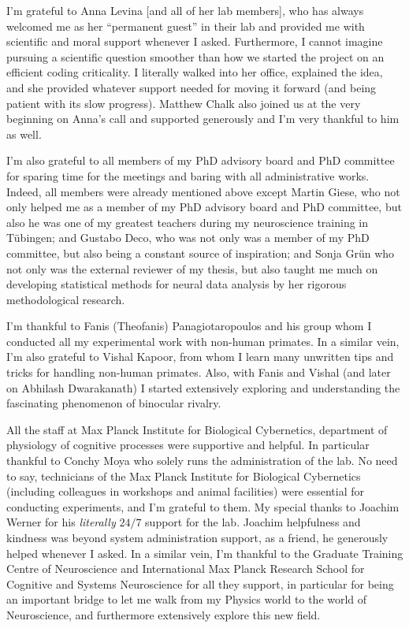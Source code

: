I'm grateful to Anna Levina [and all of her lab members], who has always welcomed me as her ``permanent guest'' in their lab and provided me with scientific and moral support whenever I asked.
Furthermore, I cannot imagine pursuing a scientific question smoother than how we started the project on an efficient coding criticality.
I literally walked into her office, explained the idea, and she provided whatever support needed for moving it forward (and being patient with its slow progress).
Matthew Chalk also joined us at the very beginning on Anna's call and supported generously and I'm very thankful to him as well.

I'm also grateful to all members of my PhD advisory board and PhD committee for sparing time for the meetings and baring with all  administrative works.
Indeed, all members were already mentioned above except Martin Giese,
who not only  helped me as a member of my PhD advisory board and PhD committee,
but also he was one of my greatest teachers during my neuroscience training in T\"ubingen;
and Gustabo Deco, who was not only was a member of my PhD committee, but also being  a constant source of inspiration;
and Sonja Gr\"un who not only was the external reviewer of my thesis, but also taught me much on developing statistical methods for neural data analysis by her rigorous methodological research.

I'm thankful
to Fanis (Theofanis) Panagiotaropoulos and his group whom I conducted all my experimental work with non-human primates.
In a similar vein, I'm also grateful to Vishal Kapoor, from whom I learn many unwritten tips and tricks for handling non-human primates.
Also, with Fanis and Vishal (and later on Abhilash Dwarakanath) I started extensively exploring and understanding the fascinating pheno\-menon of binocular rivalry.

All the staff at Max Planck Institute for Biological Cybernetics, department of physiology of cognitive processes were supportive and helpful.
In particular thankful to Conchy Moya who solely runs the administration of the lab.
No need to say, technicians of the Max Planck Institute for Biological Cybernetics
(including colleagues in workshops and animal facilities) were essential for conducting experiments,
and I'm grateful to them.
My special thanks to Joachim Werner for his \emph{literally} $24/7$ support for the lab.
Joachim helpfulness and kindness was beyond system administration support,
as a friend, he generously helped whenever I asked.
In a similar vein, I'm thankful to the Graduate Training Centre of Neuroscience and International Max Planck Research School for Cognitive and Systems Neuroscience for all they support,
in particular for being an important bridge to let me walk from my Physics world to the world of Neuroscience, and furthermore extensively explore this new field.


